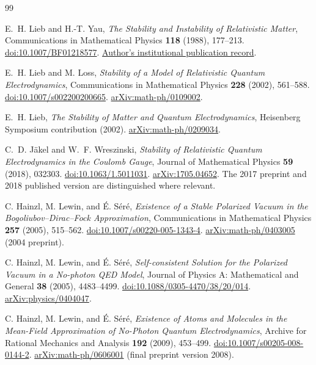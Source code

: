 {}
\begin{thebibliography}{99}

E.~H. Lieb and H.-T. Yau,
\emph{The Stability and Instability of Relativistic Matter},
Communications in Mathematical Physics \textbf{118} (1988), 177--213.
\href{https://doi.org/10.1007/BF01218577}{doi:10.1007/BF01218577}.
\href{https://collaborate.princeton.edu/en/publications/the-stability-and-instability-of-relativistic-matter-2/}{Author's institutional publication record}.

E.~H. Lieb and M. Loss,
\emph{Stability of a Model of Relativistic Quantum Electrodynamics},
Communications in Mathematical Physics \textbf{228} (2002), 561--588.
\href{https://doi.org/10.1007/s002200200665}{doi:10.1007/s002200200665}.
\href{https://arxiv.org/abs/math-ph/0109002}{arXiv:math-ph/0109002}.

E.~H. Lieb,
\emph{The Stability of Matter and Quantum Electrodynamics},
Heisenberg Symposium contribution (2002).
\href{https://arxiv.org/abs/math-ph/0209034}{arXiv:math-ph/0209034}.

C.~D. J\"akel and W.~F. Wreszinski,
\emph{Stability of Relativistic Quantum Electrodynamics in the Coulomb Gauge},
Journal of Mathematical Physics \textbf{59} (2018), 032303.
\href{https://doi.org/10.1063/1.5011031}{doi:10.1063/1.5011031}.
\href{https://arxiv.org/abs/1705.04652}{arXiv:1705.04652}.
The 2017 preprint and 2018 published version are distinguished where relevant.

C. Hainzl, M. Lewin, and \'{E}. S\'er\'e,
\emph{Existence of a Stable Polarized Vacuum in the Bogoliubov--Dirac--Fock Approximation},
Communications in Mathematical Physics \textbf{257} (2005), 515--562.
\href{https://doi.org/10.1007/s00220-005-1343-4}{doi:10.1007/s00220-005-1343-4}.
\href{https://arxiv.org/abs/math-ph/0403005}{arXiv:math-ph/0403005}
(2004 preprint).

C. Hainzl, M. Lewin, and \'{E}. S\'er\'e,
\emph{Self-consistent Solution for the Polarized Vacuum in a No-photon QED Model},
Journal of Physics A: Mathematical and General \textbf{38} (2005), 4483--4499.
\href{https://doi.org/10.1088/0305-4470/38/20/014}{doi:10.1088/0305-4470/38/20/014}.
\href{https://arxiv.org/abs/physics/0404047}{arXiv:physics/0404047}.

C. Hainzl, M. Lewin, and \'{E}. S\'er\'e,
\emph{Existence of Atoms and Molecules in the Mean-Field Approximation of No-Photon Quantum Electrodynamics},
Archive for Rational Mechanics and Analysis \textbf{192} (2009), 453--499.
\href{https://doi.org/10.1007/s00205-008-0144-2}{doi:10.1007/s00205-008-0144-2}.
\href{https://arxiv.org/abs/math-ph/0606001}{arXiv:math-ph/0606001}
(final preprint version 2008).


\end{thebibliography}
